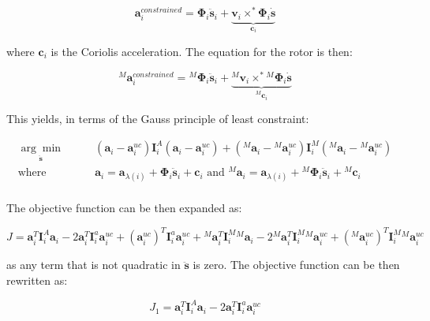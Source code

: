 \begin{equation}
    \mathbf{a} ^{constrained} _i = \boldsymbol{\Phi} _i \ddot{\mathbf{s}} _i + \underbrace{\mathbf{v} _i \times ^* \boldsymbol{\Phi} _i \dot{\mathbf{s}}} _{\mathbf{c} _i}
\end{equation}

where $\mathbf{c} _i$ is the Coriolis acceleration. The equation for the rotor is then:

\begin{equation}
    {} ^M \mathbf{a} ^{constrained} _i = {} ^M \boldsymbol{\Phi} _i \ddot{\mathbf{s}} _i + \underbrace{{} ^M \mathbf{v} _i \times ^* {} ^M\boldsymbol{\Phi} _i \dot{\mathbf{s}}} _{{} ^M \mathbf{c} _i}
\end{equation}

This yields, in terms of the Gauss principle of least constraint:

\begin{align}
    \underset{\ddot{\mathbf{s}}}{\arg \min} & \qquad (\mathbf{a} _i - \mathbf{a} _i ^{uc}) \mathbf{I} ^A _i (\mathbf{a} _i - \mathbf{a} _i ^{uc}) + ({} ^M \mathbf{a} _i - {} ^M \mathbf{a} _i ^{uc}) \mathbf{I} ^M _i ({} ^M \mathbf{a} _i - {} ^M \mathbf{a} _i ^{uc}) \nonumber                         \\
    \text{where }                           & \qquad \mathbf{a} _i = \mathbf{a} _{\lambda (i)} + \boldsymbol{\Phi} _i \ddot{\mathbf{s}} _i + \mathbf{c} _i \text{ and } {} ^M \mathbf{a} _i = \mathbf{a} _{\lambda (i)} + {} ^M  \boldsymbol{\Phi} _i \ddot{\mathbf{s}} _i + {} ^M \mathbf{c} _i \nonumber \\
\end{align}

The objective function can be then expanded as:

\begin{equation}
    J = \mathbf{a} ^T _i \mathbf{I} ^A _i \mathbf{a} _i - 2\mathbf{a} ^T _i \mathbf{I} ^a _i \mathbf{a} ^{uc} _i + (\mathbf{a} ^{uc} _i) ^T \mathbf{I} ^a _i \mathbf{a} ^{uc} _i + {} ^M \mathbf{a} ^T _i \mathbf{I} ^M _i {} ^M \mathbf{a} _i - 2 {} ^M \mathbf{a} ^T _i \mathbf{I} ^M _i {} ^M \mathbf{a} ^{uc} _i + ({} ^M \mathbf{a} ^{uc} _i) ^T \mathbf{I} ^M _i {} ^M \mathbf{a} ^{uc} _i
\end{equation}

as any term that is not quadratic in $\ddot{\mathbf{s}}$ is zero. The objective function can be then rewritten as:

\begin{equation}
    J _1 = \mathbf{a} ^T _i \mathbf{I} ^A _i \mathbf{a} _i - 2\mathbf{a} ^T _i \mathbf{I} ^a _i \mathbf{a} ^{uc} _i
\end{equation}


